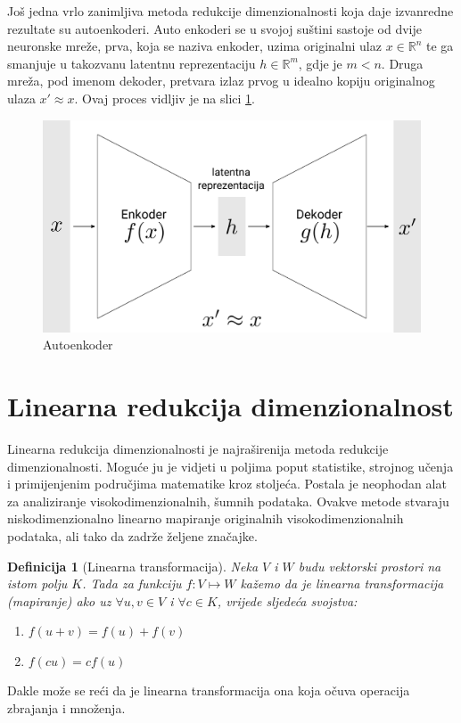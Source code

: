 \documentclass[times, utf8, diplomski]{fer}
\newtheorem{definition}{Definicija}         %
\begin{document}
\medskip
Još jedna vrlo zanimljiva metoda redukcije dimenzionalnosti koja daje izvanredne rezultate su autoenkoderi. Auto enkoderi se u svojoj suštini sastoje od dvije neuronske mreže, prva, koja se naziva enkoder, uzima originalni ulaz \(x \in \mathbb{R}^n\) te ga smanjuje u takozvanu latentnu reprezentaciju \(h \in \mathbb{R}^m\), gdje je \(m < n\). Druga mreža, pod imenom dekoder, pretvara izlaz prvog u idealno kopiju originalnog ulaza \(x' \approx x\). Ovaj proces vidljiv je na slici \ref{fig:autoencoder}.

\begin{figure}[htb]
    \centering
    \includegraphics[width=12cm]{resources/images/reduction/autoencoder.png}
    \caption{Autoenkoder}
    \label{fig:autoencoder}
\end{figure}

\section{Linearna redukcija dimenzionalnost}\label{sec:lin_reduc}

Linearna redukcija dimenzionalnosti  je najraširenija metoda redukcije dimenzionalnosti. Moguće ju je vidjeti u poljima poput statistike, strojnog učenja i primijenjenim područjima matematike kroz stoljeća. Postala je neophodan alat za analiziranje visokodimenzionalnih, šumnih podataka. Ovakve metode stvaraju niskodimenzionalno linearno mapiranje originalnih visokodimenzionalnih podataka, ali tako da zadrže željene značajke.

\begin{definition}[Linearna transformacija]
    Neka $V$ i $W$ budu vektorski prostori na istom polju $K$. Tada za funkciju $f: V \mapsto W$ kažemo da je linearna transformacija (mapiranje) ako uz $\forall u,v \in V$ i $\forall c \in K$, vrijede sljedeća svojstva:
    \begin{center}
        \begin{varwidth}{\textwidth}
            \begin{enumerate}
                \item $f(u + v) = f(u) + f(v)$
                \item $f(cu) = cf(u)$
            \end{enumerate}
        \end{varwidth}
    \end{center}
\end{definition}
Dakle može se reći da je linearna transformacija ona koja očuva operacija zbrajanja i množenja.
\end{document}
